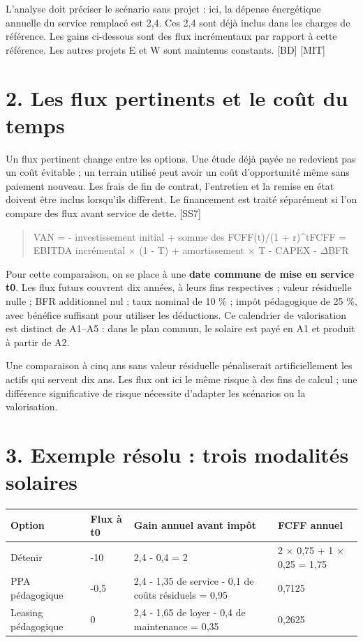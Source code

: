 \documentclass[12pt,a4paper]{article}
\begin{document}
L’analyse doit préciser le scénario sans projet : ici, la dépense énergétique annuelle du service remplacé est 2,4. Ces 2,4 sont déjà inclus dans les charges de référence. Les gains ci-dessous sont des flux incrémentaux par rapport à cette référence. Les autres projets E et W sont maintenus constants. [BD] [MIT]

\section*{2. Les flux pertinents et le coût du temps}
Un flux pertinent change entre les options. Une étude déjà payée ne redevient pas un coût évitable ; un terrain utilisé peut avoir un coût d’opportunité même sans paiement nouveau. Les frais de fin de contrat, l’entretien et la remise en état doivent être inclus lorsqu’ils diffèrent. Le financement est traité séparément si l’on compare des flux avant service de dette. [SS7]



\begin{quote}\small VAN = - investissement initial + somme des FCFF(t)/(1 + r)\textasciicircum{}t\newline FCFF = EBITDA incrémental $\times$ (1 - T) + amortissement $\times$ T - CAPEX - $\Delta$BFR\end{quote}

Pour cette comparaison, on se place à une \textbf{date commune de mise en service t0}. Les flux futurs couvrent dix années, à leurs fins respectives ; valeur résiduelle nulle ; BFR additionnel nul ; taux nominal de 10 \% ; impôt pédagogique de 25 \%, avec bénéfice suffisant pour utiliser les déductions. Ce calendrier de valorisation est distinct de A1--A5 : dans le plan commun, le solaire est payé en A1 et produit à partir de A2.


Une comparaison à cinq ans sans valeur résiduelle pénaliserait artificiellement les actifs qui servent dix ans. Les flux ont ici le même risque à des fins de calcul ; une différence significative de risque nécessite d’adapter les scénarios ou la valorisation.

\section*{3. Exemple résolu : trois modalités solaires}

\Needspace{180pt}
\begin{longtable}{p{3.67cm}p{3.67cm}p{3.67cm}p{3.67cm}}
\toprule
Option & Flux à t0 & Gain annuel avant impôt & FCFF annuel \\
\midrule\endhead
Détenir & -10 & 2,4 - 0,4 = 2 & 2 $\times$ 0,75 + 1 $\times$ 0,25 = 1,75 \\
PPA pédagogique & -0,5 & 2,4 - 1,35 de service - 0,1 de coûts résiduels = 0,95 & 0,7125 \\
Leasing pédagogique & 0 & 2,4 - 1,65 de loyer - 0,4 de maintenance = 0,35 & 0,2625 \\
\bottomrule
\end{longtable}
\end{document}
